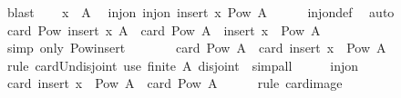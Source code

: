 \begin{isabellebody}
\ blast\isanewline
\ \ \isamarkupfalse%
\ {\isacartoucheopen}x\ {\isasymnotin}\ A{\isacartoucheclose}\ \isamarkupfalse%
\ inj{\isacharunderscore}{\kern0pt}on{\isacharcolon}{\kern0pt}\ {\isachardoublequoteopen}inj{\isacharunderscore}{\kern0pt}on\ {\isacharparenleft}{\kern0pt}insert\ x{\isacharparenright}{\kern0pt}\ {\isacharparenleft}{\kern0pt}Pow\ A{\isacharparenright}{\kern0pt}{\isachardoublequoteclose}\isanewline
\ \ \ \ \isamarkupfalse%
\ inj{\isacharunderscore}{\kern0pt}on{\isacharunderscore}{\kern0pt}def\ \isamarkupfalse%
\ auto\isanewline
\isanewline
\ \ \isamarkupfalse%
\ {\isachardoublequoteopen}card\ {\isacharparenleft}{\kern0pt}Pow\ {\isacharparenleft}{\kern0pt}insert\ x\ A{\isacharparenright}{\kern0pt}{\isacharparenright}{\kern0pt}\ {\isacharequal}{\kern0pt}\ card\ {\isacharparenleft}{\kern0pt}Pow\ A\ {\isasymunion}\ insert\ x\ {\isacharbackquote}{\kern0pt}\ Pow\ A{\isacharparenright}{\kern0pt}{\isachardoublequoteclose}\isanewline
\ \ \ \ \isamarkupfalse%
\ {\isacharparenleft}{\kern0pt}simp\ only{\isacharcolon}{\kern0pt}\ Pow{\isacharunderscore}{\kern0pt}insert{\isacharparenright}{\kern0pt}\isanewline
\ \ \isamarkupfalse%
\ \isamarkupfalse%
\ {\isachardoublequoteopen}{\isasymdots}\ {\isacharequal}{\kern0pt}\ card\ {\isacharparenleft}{\kern0pt}Pow\ A{\isacharparenright}{\kern0pt}\ {\isacharplus}{\kern0pt}\ card\ {\isacharparenleft}{\kern0pt}insert\ x\ {\isacharbackquote}{\kern0pt}\ Pow\ A{\isacharparenright}{\kern0pt}{\isachardoublequoteclose}\isanewline
\ \ \ \ \isamarkupfalse%
\ {\isacharparenleft}{\kern0pt}rule\ card{\isacharunderscore}{\kern0pt}Un{\isacharunderscore}{\kern0pt}disjoint{\isacharparenright}{\kern0pt}\ {\isacharparenleft}{\kern0pt}use\ {\isacartoucheopen}finite\ A{\isacartoucheclose}\ disjoint\ \ simp{\isacharunderscore}{\kern0pt}all{\isacharparenright}{\kern0pt}\isanewline
\ \ \isamarkupfalse%
\ \isamarkupfalse%
\ inj{\isacharunderscore}{\kern0pt}on\ \isamarkupfalse%
\ {\isachardoublequoteopen}card\ {\isacharparenleft}{\kern0pt}insert\ x\ {\isacharbackquote}{\kern0pt}\ Pow\ A{\isacharparenright}{\kern0pt}\ {\isacharequal}{\kern0pt}\ card\ {\isacharparenleft}{\kern0pt}Pow\ A{\isacharparenright}{\kern0pt}{\isachardoublequoteclose}\isanewline
\ \ \ \ \isamarkupfalse%
\ {\isacharparenleft}{\kern0pt}rule\ card{\isacharunderscore}{\kern0pt}image{\isacharparenright}{\kern0pt}\isanewline
\ \ \isamarkupfalse%

\end{isabellebody}
